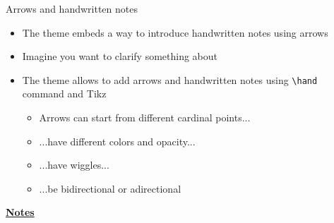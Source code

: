 \documentclass[10pt]{beamer}
\begin{document}
\begin{frame}[t]
    {Arrows and handwritten notes}\bigskip
    \begin{itemize}
        \item The theme embeds a way to introduce handwritten notes using arrows \bigskip\medskip
        \item Imagine you want to clarify something about  \bigskip\medskip
        \item The theme allows to add arrows and handwritten notes using \texttt{\textbackslash hand} command and Tikz \medskip
        \begin{itemize}
            \item Arrows can start from different cardinal points... \medskip
            \item ...have different colors and opacity... \medskip
            \item ...have wiggles... \medskip
            \item ...be bidirectional or adirectional
        \end{itemize}
    \end{itemize}
\end{frame}
\begin{flushleft}
    \underline{\textbf{Notes}}\setlength{\parskip}{.15cm}\notesize\newline\par
\end{flushleft}
\end{document}
